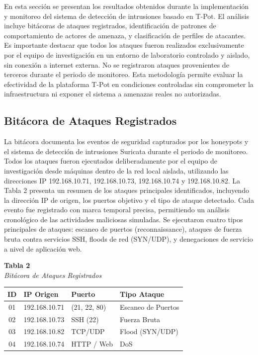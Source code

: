 En esta sección se presentan los resultados obtenidos durante la implementación y monitoreo del sistema de detección de intrusiones basado en T-Pot. El análisis incluye bitácoras de ataques registrados, identificación de patrones de comportamiento de actores de amenaza, y clasificación de perfiles de atacantes. Es importante destacar que todos los ataques fueron realizados exclusivamente por el equipo de investigación en un entorno de laboratorio controlado y aislado, sin conexión a internet externa. No se registraron ataques provenientes de terceros durante el periodo de monitoreo. Esta metodología permite evaluar la efectividad de la plataforma T-Pot en condiciones controladas sin comprometer la infraestructura ni exponer el sistema a amenazas reales no autorizadas.

\subsection{Bitácora de Ataques Registrados}

La bitácora documenta los eventos de seguridad capturados por los honeypots y el sistema de detección de intrusiones Suricata durante el periodo de monitoreo. Todos los ataques fueron ejecutados deliberadamente por el equipo de investigación desde máquinas dentro de la red local aislada, utilizando las direcciones IP 192.168.10.71, 192.168.10.73, 192.168.10.74 y 192.168.10.82. La Tabla 2 presenta un resumen de los ataques principales identificados, incluyendo la dirección IP de origen, los puertos objetivo y el tipo de ataque detectado. Cada evento fue registrado con marca temporal precisa, permitiendo un análisis cronológico de las actividades maliciosas simuladas. Se ejecutaron cuatro tipos principales de ataques: escaneo de puertos (reconnaissance), ataques de fuerza bruta contra servicios SSH, floods de red (SYN/UDP), y denegaciones de servicio a nivel de aplicación web.

\begin{table}[htbp]
\centering
{\fontsize{8}{10}\selectfont
\textbf{Tabla 2}\\[2pt]
\textit{Bit\'{a}cora de Ataques Registrados}
}
\vspace{2mm}
\label{tab:bitacora1}
{\fontsize{6.5}{8}\selectfont
\setlength{\tabcolsep}{2pt}
\begin{tabular}{@{}cp{2cm}p{1.5cm}p{3.3cm}@{}}
\hline
ID & IP Origen & Puerto & Tipo Ataque \\
\hline
01 & 192.168.10.71 & (21, 22, 80) & Escaneo de Puertos \\
02 & 192.168.10.73 & SSH (22) & Fuerza Bruta \\
03 & 192.168.10.82 & TCP/UDP & Flood (SYN/UDP) \\
04 & 192.168.10.74 & HTTP / Web & DoS \\
\hline
\end{tabular}}
\end{table}

